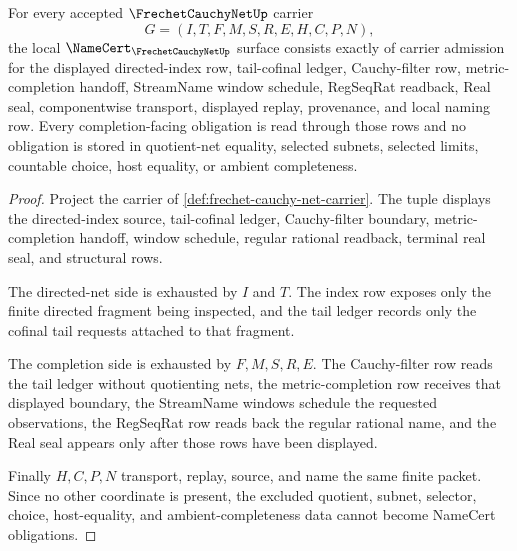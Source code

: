 \begin{theorem}
\label{thm:frechet-cauchy-net-namecert-obligations}
For every accepted $\FrechetCauchyNetUp$ carrier
$$
G=(I,T,F,M,S,R,E,H,C,P,N),
$$
the local $\NameCert_{\FrechetCauchyNetUp}$ surface consists exactly of carrier admission for the displayed directed-index row, tail-cofinal ledger, Cauchy-filter row, metric-completion handoff, StreamName window schedule, RegSeqRat readback, Real seal, componentwise transport, displayed replay, provenance, and local naming row. Every completion-facing obligation is read through those rows and no obligation is stored in quotient-net equality, selected subnets, selected limits, countable choice, host equality, or ambient completeness.
\end{theorem}
\begin{proof}
Project the carrier of \autoref{def:frechet-cauchy-net-carrier}. The tuple displays the directed-index source, tail-cofinal ledger, Cauchy-filter boundary, metric-completion handoff, window schedule, regular rational readback, terminal real seal, and structural rows.

The directed-net side is exhausted by $I$ and $T$. The index row exposes only the finite directed fragment being inspected, and the tail ledger records only the cofinal tail requests attached to that fragment.

The completion side is exhausted by $F,M,S,R,E$. The Cauchy-filter row reads the tail ledger without quotienting nets, the metric-completion row receives that displayed boundary, the StreamName windows schedule the requested observations, the RegSeqRat row reads back the regular rational name, and the Real seal appears only after those rows have been displayed.

Finally $H,C,P,N$ transport, replay, source, and name the same finite packet. Since no other coordinate is present, the excluded quotient, subnet, selector, choice, host-equality, and ambient-completeness data cannot become NameCert obligations.
\end{proof}

